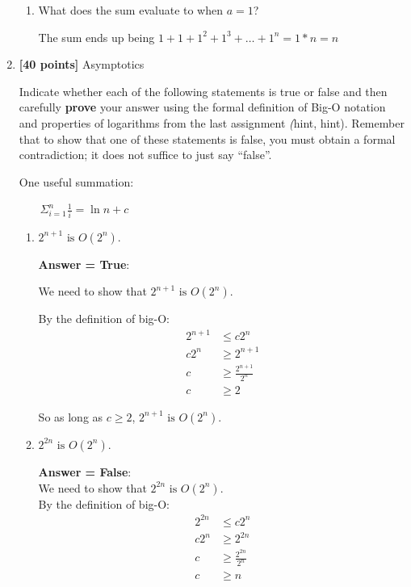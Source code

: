 \documentclass[11pt]{article}
\begin{document}
\begin{enumerate}
\begin{enumerate}
\item What does the sum evaluate to when $a = 1$?

The sum ends up being $1 + 1 + 1^{2} + 1^{3} + \ldots + 1^{n}=1*n=n$
 \end{enumerate}

\vspace*{.2cm}

\item \textbf{[40 points]} Asymptotics

Indicate whether each of the following statements
is true or false and then carefully {\bf prove} your answer using the formal
definition of Big-O notation and properties of logarithms from the last assignment \emph(hint, hint).  
Remember that to show that one of these statements is false, you must
obtain a formal contradiction; it does not suffice to just say ``false''. 

One useful summation:

\mbox{~~~} $\Sigma_{i=1}^n \frac{1}{i} = \ln n + c$


\begin{enumerate}
        \item $2^{n+1} \mbox{ is } O(2^{n})$.

\textbf{Answer = True}:

We need to show that $2^{n+1} \mbox{ is } O(2^{n})$.

By the definition of big-O:
    \begin{align*}
        2^{n+1} &\le c2^n \\
        c2^n &\ge 2^{n+1} \\
        c &\ge \frac{2^{n+1}}{2^n} \\
        c &\ge 2
    \end{align*}

So as long as $c \ge 2$, $2^{n+1} \mbox{ is } O(2^{n})$.

        \item $2^{2n} \mbox{ is } O(2^{n})$.

\textbf{Answer = False}:\\
We need to show that $2^{2n} \mbox{ is } O(2^{n})$. \\
By the definition of big-O:\\
    \begin{align*}
        2^{2n} &\le c2^n \\
        c2^n &\ge 2^{2n} \\
        c &\ge \frac{2^{2n}}{2^n} \\
        c &\ge n
    \end{align*}


\end{enumerate}
\end{enumerate}
\end{document}
